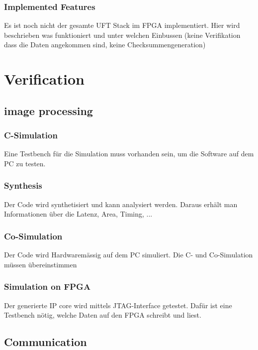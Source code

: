 \subsubsection{Implemented Features}
Es ist noch nicht der gesamte UFT Stack im FPGA implementiert. Hier wird beschrieben
was funktioniert und unter welchen Einbussen (keine Verifikation dass die Daten
angekommen sind, keine Checksummengeneration)

\section{Verification}
\subsection{image processing}
\subsubsection{C-Simulation}
Eine Testbench für die Simulation muss vorhanden sein, um die Software auf dem PC zu testen.

\subsubsection{Synthesis}
Der Code wird synthetisiert und kann analysiert werden. Daraus erhält man Informationen über die Latenz, Area, Timing, ...

\subsubsection{Co-Simulation}
Der Code wird Hardwaremässig auf dem PC simuliert. Die C- und Co-Simulation müssen übereinstimmen

\subsubsection{Simulation on FPGA}
Der generierte IP core wird mittels JTAG-Interface getestet. Dafür ist eine Testbench nötig, welche Daten auf den FPGA schreibt und liest.

\subsection{Communication}
